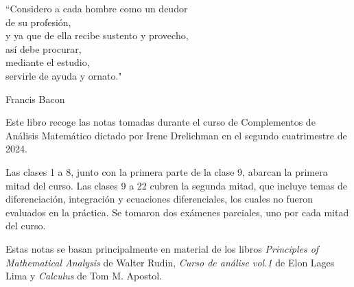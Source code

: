 \epigraph{``Considero a cada hombre como un deudor \\ de su profesión, \\ y ya que de ella recibe sustento y provecho, \\ así debe procurar, \\ mediante el estudio, \\ servirle de ayuda y ornato."}{Francis Bacon}

Este libro recoge las notas tomadas durante el curso de Complementos de Análisis Matemático dictado por Irene Drelichman en el segundo cuatrimestre de 2024.

Las clases 1 a 8, junto con la primera parte de la clase 9, abarcan la primera mitad del curso. Las clases 9 a 22 cubren la segunda mitad, que incluye temas de diferenciación, integración y ecuaciones diferenciales, los cuales no fueron evaluados en la práctica. Se tomaron dos exámenes parciales, uno por cada mitad del curso.

Estas notas se basan principalmente en material de los libros \textit{Principles of Mathematical Analysis} de Walter Rudin, \textit{Curso de análise vol.1} de Elon Lages Lima y \textit{Calculus} de Tom M. Apostol.
